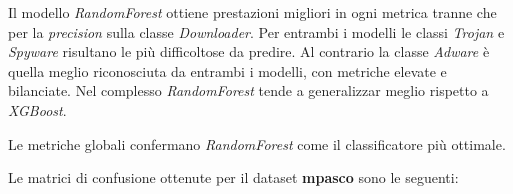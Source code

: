 \begin{figure}[]
    \centering
    \caption{}
    \label{fig:octack-xgb-rc}
\end{figure}

\begin{figure}[]
    \centering
    \caption{}
    \label{fig:octack-xgb-f1}
\end{figure}

\FloatBarrier


Il modello \textit{RandomForest} ottiene prestazioni migliori in ogni metrica tranne che per la \textit{precision} sulla classe \textit{Downloader}.
Per entrambi i modelli le classi \textit{Trojan} e \textit{Spyware} risultano le più difficoltose da predire.
Al contrario la classe \textit{Adware} è quella meglio riconosciuta da entrambi i modelli, con metriche elevate e bilanciate.
Nel complesso \textit{RandomForest} tende a generalizzar meglio rispetto a \textit{XGBoost}.

\begin{figure}[t]
    \centering
    \caption{}
    \label{fig:octack-clx-met}
\end{figure}

\FloatBarrier

Le metriche globali confermano \textit{RandomForest} come il classificatore più ottimale.


Le matrici di confusione ottenute per il dataset \textbf{mpasco} sono le seguenti:

\begin{figure}[t]
    \centering
    \caption{}
    \label{fig:octack-mtrx-rf}
\end{figure}

